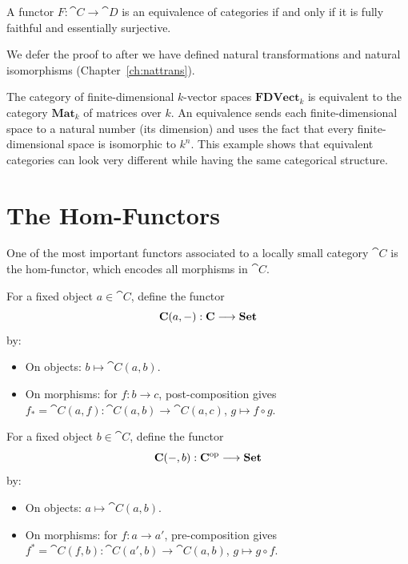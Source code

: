 \begin{theorem}
A functor $F: \cat{C} \to \cat{D}$ is an equivalence of categories if and only if it is fully faithful and essentially surjective.
\end{theorem}

We defer the proof to after we have defined natural transformations and natural isomorphisms (Chapter~\ref{ch:nattrans}).

\begin{example}
The category of finite-dimensional $k$-vector spaces $\mathbf{FDVect}_k$ is equivalent to the category $\mathbf{Mat}_k$ of matrices over $k$. An equivalence sends each finite-dimensional space to a natural number (its dimension) and uses the fact that every finite-dimensional space is isomorphic to $k^n$. This example shows that equivalent categories can look very different while having the same categorical structure.
\end{example}

\section{The Hom-Functors}
\label{sec:hom-functors}

One of the most important functors associated to a locally small category $\cat{C}$ is the hom-functor, which encodes all morphisms in $\cat{C}$.

\begin{definition}
For a fixed object $a \in \cat{C}$, define the functor
\[
  \mathbf{C}(a, -): \mathbf{C} \longrightarrow \mathbf{Set}
\]
by:
\begin{itemize}
  \item On objects: $b \mapsto \cat{C}(a, b)$.
  \item On morphisms: for $f: b \to c$, post-composition gives $f_* = \cat{C}(a,f): \cat{C}(a,b) \to \cat{C}(a,c)$, $g \mapsto f \circ g$.
\end{itemize}
\end{definition}

\begin{definition}
For a fixed object $b \in \cat{C}$, define the functor
\[
  \mathbf{C}(-, b): \mathbf{C}^{\mathrm{op}} \longrightarrow \mathbf{Set}
\]
by:
\begin{itemize}
  \item On objects: $a \mapsto \cat{C}(a, b)$.
  \item On morphisms: for $f: a \to a'$, pre-composition gives $f^* = \cat{C}(f,b): \cat{C}(a',b) \to \cat{C}(a,b)$, $g \mapsto g \circ f$.
\end{itemize}
\end{definition}

